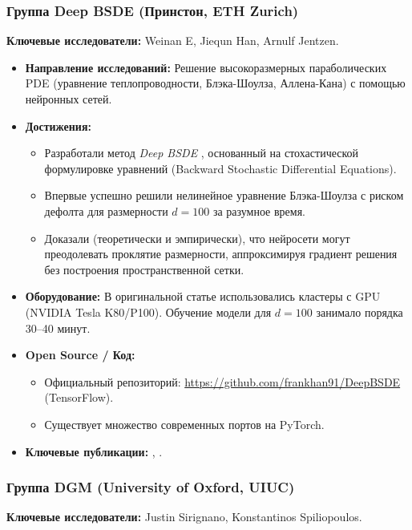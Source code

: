 \subsubsection{Группа Deep BSDE (Принстон, ETH Zurich)}
\textbf{Ключевые исследователи:} Weinan E, Jiequn Han, Arnulf Jentzen.

\begin{itemize}
    \item \textbf{Направление исследований:} Решение высокоразмерных параболических PDE (уравнение теплопроводности, Блэка-Шоулза, Аллена-Кана) с помощью нейронных сетей.
    \item \textbf{Достижения:}
    \begin{itemize}
        \item Разработали метод \textit{Deep BSDE} \cite{Han2018}, основанный на стохастической формулировке уравнений (Backward Stochastic Differential Equations).
        \item Впервые успешно решили нелинейное уравнение Блэка-Шоулза с риском дефолта для размерности $d=100$ за разумное время.
        \item Доказали (теоретически и эмпирически), что нейросети могут преодолевать проклятие размерности, аппроксимируя градиент решения без построения пространственной сетки.
    \end{itemize}
    \item \textbf{Оборудование:} В оригинальной статье использовались кластеры с GPU (NVIDIA Tesla K80/P100). Обучение модели для $d=100$ занимало порядка 30--40 минут.
    \item \textbf{Open Source / Код:}
    \begin{itemize}
        \item Официальный репозиторий: \url{https://github.com/frankhan91/DeepBSDE} (TensorFlow).
        \item Существует множество современных портов на PyTorch.
    \end{itemize}
    \item \textbf{Ключевые публикации:} \cite{Han2018}, \cite{Beck2019}.
\end{itemize}

\subsubsection{Группа DGM (University of Oxford, UIUC)}
\textbf{Ключевые исследователи:} Justin Sirignano, Konstantinos Spiliopoulos.


